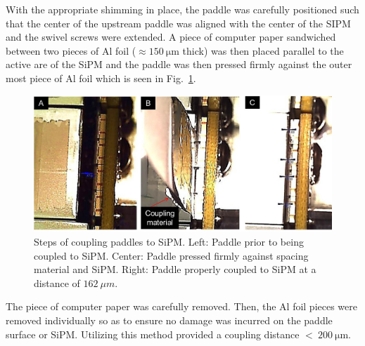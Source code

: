 With the appropriate shimming in place, the paddle was carefully positioned such that the center of the upstream paddle was aligned with the center of the SIPM and the swivel screws were extended.  A piece of computer paper sandwiched between two pieces of Al foil ($\approx 150\ \mathrm{\mu m}$ thick) was then placed parallel to the active are of the SiPM and the paddle was then pressed firmly against the outer most piece of Al foil which is seen in Fig.~\ref{fig:sipm_coupling}.
\begin{figure}[!htb]
	\centering
	\includegraphics[width=1.0\columnwidth]{fabrication/figs/st_coupling}
	\caption{Steps of coupling paddles to SiPM.  Left: Paddle prior to being coupled to SiPM.  Center:  Paddle pressed firmly against spacing material and SiPM.  Right: Paddle properly coupled to SiPM at a distance of $162\ \mu m$.}
	\label{fig:sipm_coupling}
\end{figure}
The piece of computer paper was carefully removed. Then, the Al foil pieces were removed individually so as to ensure no damage was incurred on the paddle surface or SiPM.  Utilizing this method provided a coupling distance $\mathrm{<\ 200\ \mu m}$.

